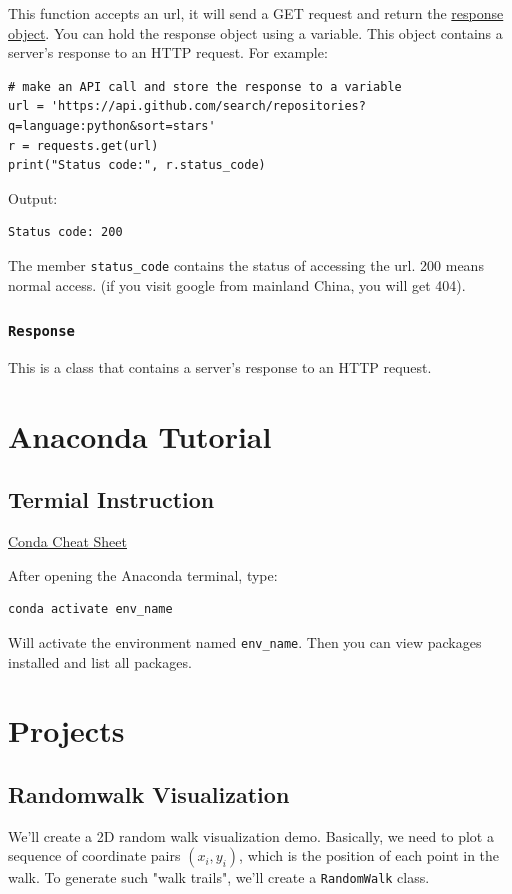 \documentclass[12pt]{book}
\begin{document}
This function accepts an url, it will send a GET request and return the \href{https://2.python-requests.org/en/master/api/\#requests.Response}{response object}. You can hold the response object using a variable. This object contains a server's response to an HTTP request. For example:
\begin{verbatim}
# make an API call and store the response to a variable
url = 'https://api.github.com/search/repositories?q=language:python&sort=stars'
r = requests.get(url)
print("Status code:", r.status_code)
\end{verbatim}
Output:
\begin{verbatim}
Status code: 200
\end{verbatim}
The member \texttt{status\_code} contains the status of accessing the url. 200 means normal access. (if you visit google from mainland China, you will get 404).

\section{\texttt{Response}}
\label{sec:org27db90c}
This is a class that contains a server's response to an HTTP request.
\part{Anaconda Tutorial}
\label{sec:orgaa0f0bc}
\chapter{Termial Instruction}
\label{sec:org02d3d8d}
\href{https://docs.conda.io/projects/conda/en/4.6.0/\_downloads/52a95608c49671267e40c689e0bc00ca/conda-cheatsheet.pdf}{Conda Cheat Sheet}

After opening the Anaconda terminal, type:
\begin{verbatim}
conda activate env_name
\end{verbatim}
Will activate the environment named \texttt{env\_name}. Then you can view packages installed and list all packages.

\part{Projects}
\label{sec:org3876266}
\chapter{Randomwalk Visualization}
\label{sec:org3d0187a}
We'll create a 2D random walk visualization demo. Basically, we need to plot a sequence of coordinate pairs \((x_i, y_i)\), which is the position of each point in the walk. To generate such "walk trails", we'll create a \texttt{RandomWalk} class.
\end{document}
